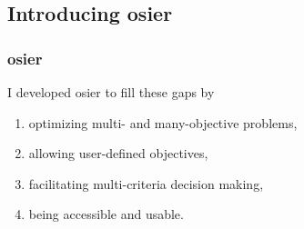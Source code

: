 

\subsection{Introducing \gls{osier}}
\begin{frame}
    \frametitle{\gls{osier}}
    I developed \gls{osier} to fill these gaps by \cite{dotson_osier_2024}
    \begin{enumerate}[<+->]
        \item optimizing multi- and many-objective problems,
        \item allowing user-defined objectives,
        \item facilitating multi-criteria decision making,
        \item being accessible and usable.
    \end{enumerate}
\end{frame}

